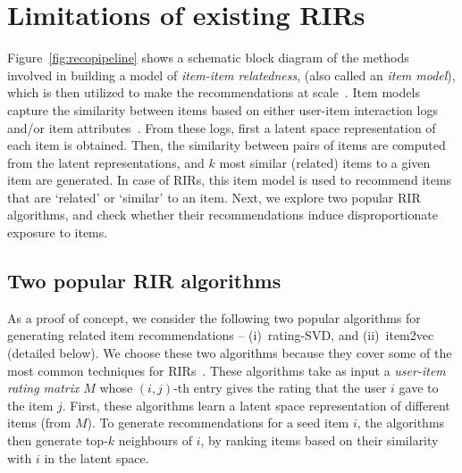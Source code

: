 
\section{Limitations of existing RIRs}
\label{sec: motivation}


Figure~\ref{fig:recopipeline} shows a schematic block diagram of the methods involved in building a model of {\it item-item relatedness}, (also called an \textit{item model}), which is then utilized
to make the recommendations at scale~\cite{smith2017two,nikolakopoulos2019recwalk}.
Item models 
capture the similarity %
between items based on either user-item interaction logs and/or item attributes~\cite{sarwar2001item, ning2011slim, desrosiers2011comprehensive}. From these logs, %
first a latent space representation of each item is obtained. 
Then, the similarity between pairs of items are computed from the latent representations, 
and $k$ most similar (related) items to a given item are generated. In case of RIRs, this item model is used to recommend items that are `related' or `similar' to an item.  
Next, we explore two popular RIR algorithms, %
and check whether their recommendations %
induce disproportionate exposure to items.%


\vspace{-2 mm}
\subsection{Two popular RIR algorithms}\label{sec: RIRAlgos}
As a proof of concept, we consider the following two popular algorithms for generating related item recommendations -- (i)~rating-SVD, and (ii)~item2vec (detailed below). 
We choose these two algorithms because they cover some of the most common techniques for RIRs~\cite{yao2018judging}.
These algorithms take as input %
a {\it user-item rating matrix} $M$ whose $(i,j)$-th entry gives the rating that the user $i$ gave to the item $j$. 
First, these algorithms learn a latent space representation of different items (from $M$). 
To generate recommendations for a seed item $i$, the algorithms then generate top-$k$ neighbours of $i$, by ranking items based on their similarity with $i$ in the latent space. 


